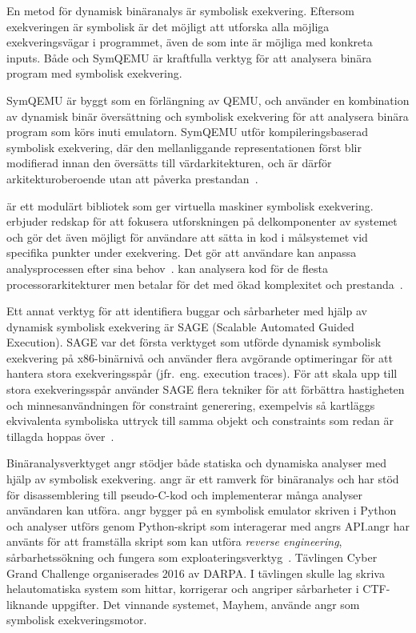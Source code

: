 En metod för dynamisk binäranalys är symbolisk exekvering. Eftersom exekveringen är symbolisk är
det möjligt att utforska alla möjliga exekveringsvägar i programmet, även de som inte är möjliga
med konkreta inputs. Både \stoe{} och SymQEMU är kraftfulla verktyg för att analysera binära program
med symbolisk exekvering.

SymQEMU är byggt som en förlängning av QEMU, och använder en kombination av dynamisk binär
översättning och symbolisk exekvering för att analysera binära program som körs inuti emulatorn.
SymQEMU utför kompileringsbaserad symbolisk exekvering, där den mellanliggande representationen först blir modifierad
innan den översätts till värdarkitekturen, och är därför arkitekturoberoende utan att påverka prestandan~\cite{symqemu}.

\stoe{} är ett modulärt bibliotek som ger virtuella maskiner symbolisk exekvering. \stoe{} erbjuder
redskap för att fokusera utforskningen på delkomponenter av systemet och gör det även
möjligt för användare att sätta in kod i målsystemet vid specifika punkter under
exekvering. Det gör att användare kan anpassa analysprocessen efter sina behov~\cite{s2e}.
\stoe{} kan analysera kod för de flesta processorarkitekturer men betalar för det med ökad
komplexitet och prestanda~\cite{symqemu}.

Ett annat verktyg för att identifiera buggar och sårbarheter med hjälp av dynamisk symbolisk
exekvering är SAGE (Scalable Automated Guided Execution).
SAGE var det första verktyget som utförde dynamisk symbolisk exekvering på x86-binärnivå och använder flera
avgörande optimeringar för att hantera stora exekveringsspår (jfr.\ eng. execution traces).
För att skala upp till stora exekveringsspår använder SAGE flera tekniker för att förbättra hastigheten och
minnesanvändningen för constraint generering, exempelvis så kartläggs ekvivalenta symboliska uttryck till samma
objekt och constraints som redan är tillagda hoppas över~\cite{sage}.

Binäranalysverktyget angr stödjer både statiska och dynamiska analyser med hjälp
av symbolisk exekvering. angr är ett ramverk för binäranalys och har stöd för
disassemblering till pseudo-C-kod och implementerar många analyser användaren
kan utföra. angr bygger på en symbolisk emulator skriven i Python och analyser
utförs genom Python-skript som interagerar med angrs API.\@ angr har använts för
att framställa skript som kan utföra \emph{reverse engineering},
sårbarhetssökning och fungera som exploateringsverktyg~\cite{angr_docs}.
Tävlingen Cyber Grand Challenge organiserades 2016 av DARPA. I tävlingen skulle
lag skriva helautomatiska system som hittar, korrigerar och angriper sårbarheter
i CTF-liknande uppgifter. Det vinnande systemet, Mayhem, använde angr som
symbolisk exekveringsmotor.

